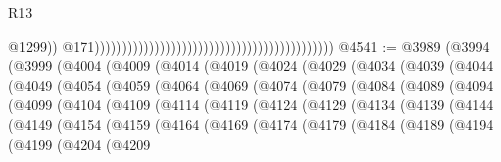 \begin{lexlean}{R13}
\begin{coremodule}
                                                                                                @1299))
                                                                                            @171))))))))))))))))))))))))))))))))))))))))))))
@4541 := @3989
    (@3994
      (@3999
        (@4004
          (@4009
            (@4014
              (@4019
                (@4024
                  (@4029
                    (@4034
                      (@4039
                        (@4044
                          (@4049
                            (@4054
                              (@4059
                                (@4064
                                  (@4069
                                    (@4074
                                      (@4079
                                        (@4084
                                          (@4089
                                            (@4094
                                              (@4099
                                                (@4104
                                                  (@4109
                                                    (@4114
                                                      (@4119
                                                        (@4124
                                                          (@4129
                                                            (@4134
                                                              (@4139
                                                                (@4144
                                                                  (@4149
                                                                    (@4154
                                                                      (@4159
                                                                        (@4164
                                                                          (@4169
                                                                            (@4174
                                                                              (@4179
                                                                                (@4184
                                                                                  (@4189
                                                                                    (@4194
                                                                                      (@4199
                                                                                        (@4204
                                                                                          (@4209

\end{coremodule}
\end{lexlean}

